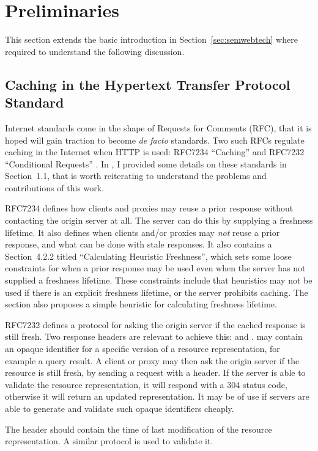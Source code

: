 \section{Preliminaries}

This section extends the basic introduction in
Section~\ref{sec:semwebtech} where required to understand the
following discussion.

\subsection{Caching in the Hypertext Transfer Protocol Standard}\label{sec:httpcache}

Internet standards come in the shape of Requests for Comments (RFC),
that it is hoped will gain traction to become \textit{de facto}
standards. Two such RFCs regulate caching in the Internet when HTTP is
used: RFC7234 ``Caching'' \cite{rfc7234} and RFC7232 ``Conditional
Requests'' \cite{rfc7232}. In \cite{kjernsmo_survey_2015}, I provided
some details on these standards in Section~1.1, that is worth
reiterating to understand the problems and contributions of this
work. 

RFC7234 defines how clients and proxies may reuse a prior response
without contacting the origin server at all. The server can do this by
supplying a freshness lifetime. It also defines when clients and/or
proxies may \emph{not} reuse a prior response, and what can be done
with stale responses. It also contains a Section~4.2.2 titled
``Calculating Heuristic Freshness'', which sets some loose constraints
for when a prior response may be used even when the server has not
supplied a freshness lifetime. These constraints include that
heuristics may not be used if there is an explicit freshness lifetime,
or the server prohibits caching. The section also proposes a simple
heuristic for calculating freshness lifetime.

RFC7232 defines a protocol for asking the origin server if the cached
response is still fresh. Two response headers are relevant to achieve
this:  and .   may
contain an opaque identifier for a specific version of a resource
representation, for example a query result. A client or proxy may then
ask the origin server if the resource is still fresh, by sending a
request with a  header. If the server is able to
validate the resource representation, it will respond with a 304
status code, otherwise it will return an updated representation. It
may be of use if servers are able to generate and validate such opaque
identifiers cheaply.

The  header should contain the time of last
modification of the resource representation. A similar protocol is
used to validate it.

